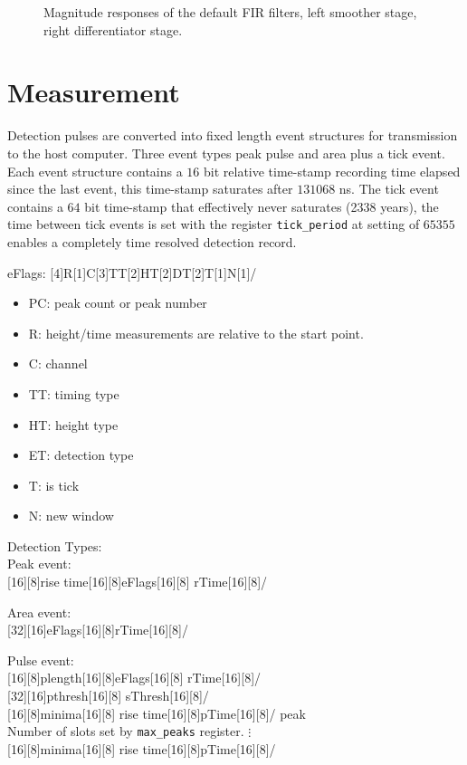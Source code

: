 \documentclass{article}
\newcommand{\code}[1]{\texttt{#1}}
\begin{document}
\begin{figure}[!hpbt]
  \centering
  
  \caption{
    Magnitude responses of the default FIR filters, left smoother stage, right
    differentiator stage.}
  \label{fig:filterresps}
\end{figure}

\clearpage

\section{Measurement}

Detection pulses are converted into fixed length event structures for
transmission to the host computer. Three event types peak pulse and area plus
a tick event. Each event structure contains a $16$ bit relative
time-stamp recording time elapsed since the last event, this time-stamp
saturates after $131068$ ns. The tick event contains a $64$ bit time-stamp that
effectively never saturates (2338 years), the time between tick events is set
with the register \code{tick\_period} at setting of $65355$ enables a completely
time resolved detection record.

\bpLittleEndian
\bpNumberBitsAbove
eFlags:
[4]R[1]C[3]{TT}[2]{HT}[2]{DT}[2]T[1]N[1]/

\begin{itemize}
  \item PC: peak count or peak number
  \item R: height/time measurements are relative to the start point.
  \item C: channel
  \item TT: timing type
  \item HT: height type
  \item ET: detection type
  \item T: is tick
  \item N: new window
\end{itemize}


Detection Types:\\
Peak event: \\
[16][8]{rise time}[16][8]{eFlags}[16][8]
{rTime}[16][8]/

Area event: \\
[32][16]{eFlags}[16][8]{rTime}[16][8]/

Pulse event: \\
[16][8]{plength}[16][8]{eFlags}[16][8]
{rTime}[16][8]/
\\
[32][16]{pthresh}[16][8]
{sThresh}[16][8]/
\\
[16][8]{minima}[16][8]
{rise time}[16][8]{pTime}[16][8]/
peak
\\
Number of slots set by \code{max\_peaks} register. $\vdots$
\\
[16][8]{minima}[16][8]
{rise time}[16][8]{pTime}[16][8]/
\end{document}
